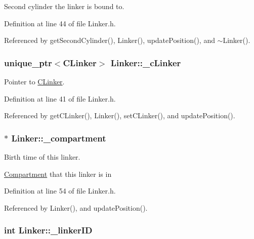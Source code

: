 Second cylinder the linker is bound to. 



Definition at line 44 of file Linker.\+h.



Referenced by get\+Second\+Cylinder(), Linker(), update\+Position(), and $\sim$\+Linker().

\hypertarget{classLinker_a6cbe666ab89dd1b4ed0eae03d8f25d63}{
\subsubsection[{\+\_\+c\+Linker}]{\setlength{\rightskip}{0pt plus 5cm}unique\+\_\+ptr$<${\bf C\+Linker}$>$ Linker\+::\+\_\+c\+Linker\hspace{0.3cm}{\ttfamily [private]}}}\label{classLinker_a6cbe666ab89dd1b4ed0eae03d8f25d63}


Pointer to \hyperlink{classCLinker}{C\+Linker}. 



Definition at line 41 of file Linker.\+h.



Referenced by get\+C\+Linker(), Linker(), set\+C\+Linker(), and update\+Position().

\hypertarget{classLinker_a1392148aae77282b3b651e21abd529a7}{
\subsubsection[{\+\_\+compartment}]{$\ast$ Linker\+::\+\_\+compartment\hspace{0.3cm}{\ttfamily [private]}}}\label{classLinker_a1392148aae77282b3b651e21abd529a7}


Birth time of this linker. 

\hyperlink{classCompartment}{Compartment} that this linker is in 

Definition at line 54 of file Linker.\+h.



Referenced by Linker(), and update\+Position().

\hypertarget{classLinker_a980a8c48b4642a13b409dcdb857028f9}{
\subsubsection[{\+\_\+linker\+I\+D}]{\setlength{\rightskip}{0pt plus 5cm}int Linker\+::\+\_\+linker\+I\+D\hspace{0.3cm}{\ttfamily [private]}}}\label{classLinker_a980a8c48b4642a13b409dcdb857028f9}


